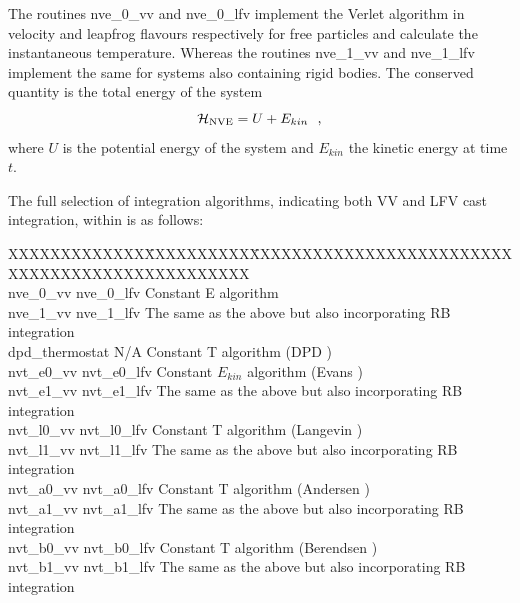 The routines {\sc nve\_0\_vv} and {\sc nve\_0\_lfv} implement the
Verlet algorithm in velocity and leapfrog
flavours respectively for free particles and calculate the
instantaneous temperature.  Whereas the routines {\sc nve\_1\_vv} and
{\sc nve\_1\_lfv} implement the same for systems also containing
rigid bodies.  The conserved quantity is the total energy of the system
\begin{equation}
{\cal H}_{\rm NVE} = U + E_{kin}~~,
\end{equation}
where $U$ is the potential energy of the system and $E_{kin}$ the
kinetic energy at time $t$.

The full selection of integration algorithms, indicating both VV and
LFV cast integration, within \D is as follows:

\begin{tabbing}
XXXXXXXXXXXXX\=XXXXXXXXXX\=XXXXXXXXXXXXXXXXXXXXXXXXXXXXXXXXXXXXXXXXXXXXXXXX\kill\\
{\sc nve\_0\_vv}      \> {\sc nve\_0\_lfv}  \> Constant E algorithm \\
{\sc nve\_1\_vv}      \> {\sc nve\_1\_lfv}  \> The same as the above but also incorporating RB integration \\
{\sc dpd\_thermostat} \> N/A            \> Constant T algorithm (DPD \cite{shardlow-03a}) \\
{\sc nvt\_e0\_vv}     \> {\sc nvt\_e0\_lfv} \> Constant $E_{kin}$ algorithm (Evans \cite{evans-84a}) \\
{\sc nvt\_e1\_vv}     \> {\sc nvt\_e1\_lfv} \> The same as the above but also incorporating RB integration \\
{\sc nvt\_l0\_vv}     \> {\sc nvt\_l0\_lfv} \> Constant T algorithm (Langevin \cite{adelman-76a}) \\
{\sc nvt\_l1\_vv}     \> {\sc nvt\_l1\_lfv} \> The same as the above but also incorporating RB integration \\
{\sc nvt\_a0\_vv}     \> {\sc nvt\_a0\_lfv} \> Constant T algorithm (Andersen \cite{andersen-79a}) \\
{\sc nvt\_a1\_vv}     \> {\sc nvt\_a1\_lfv} \> The same as the above but also incorporating RB integration \\
{\sc nvt\_b0\_vv}     \> {\sc nvt\_b0\_lfv} \> Constant T algorithm (Berendsen \cite{berendsen-84a}) \\
{\sc nvt\_b1\_vv}     \> {\sc nvt\_b1\_lfv} \> The same as the above but also incorporating RB integration \\

\end{tabbing}
